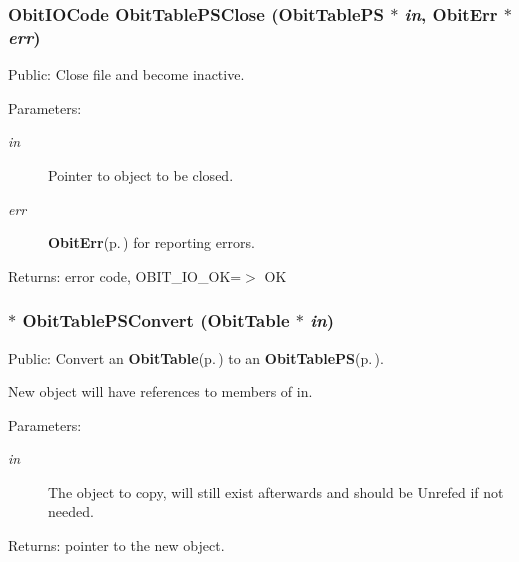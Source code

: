 \subsubsection{\setlength{\rightskip}{0pt plus 5cm}Obit\-IOCode Obit\-Table\-PSClose ({\bf Obit\-Table\-PS} $\ast$ {\em in}, {\bf Obit\-Err} $\ast$ {\em err})}\label{ObitTablePS_8c_a25}


Public: Close file and become inactive. 

\begin{Desc}
\item[Parameters:]
\begin{description}
\item[{\em in}]Pointer to object to be closed. \item[{\em err}]{\bf Obit\-Err}{\rm (p.\,\pageref{structObitErr})} for reporting errors. \end{description}
\end{Desc}
\begin{Desc}
\item[Returns:]error code, OBIT\_\-IO\_\-OK=$>$ OK \end{Desc}
\subsubsection{$\ast$ Obit\-Table\-PSConvert ({\bf Obit\-Table} $\ast$ {\em in})}\label{ObitTablePS_8c_a19}


Public: Convert an {\bf Obit\-Table}{\rm (p.\,\pageref{structObitTable})} to an {\bf Obit\-Table\-PS}{\rm (p.\,\pageref{structObitTablePS})}. 

New object will have references to members of in. \begin{Desc}
\item[Parameters:]
\begin{description}
\item[{\em in}]The object to copy, will still exist afterwards and should be Unrefed if not needed. \end{description}
\end{Desc}
\begin{Desc}
\item[Returns:]pointer to the new object. \end{Desc}
